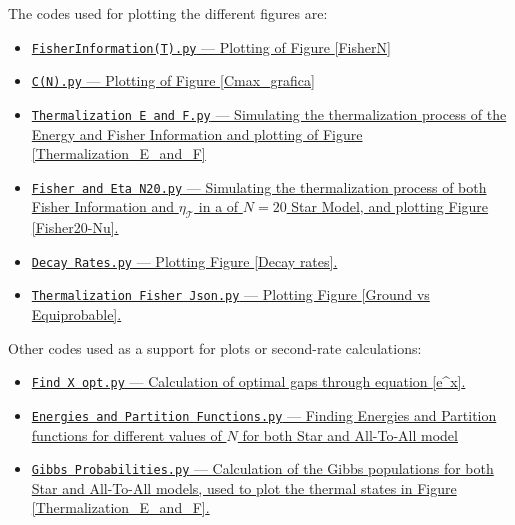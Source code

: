 \hspace{-0.5 cm}The codes used for plotting the different figures are:

\begin{itemize}
  \item \href{https://github.com/alberto7rodriguez/TFG-Alberto-Rodriguez/blob/9049af01d4c70d71c440c45a4eb79081c19504dd/FisherInformation(T).py}{\texttt{FisherInformation(T).py} — Plotting of Figure \ref{FisherN}}
  \item \href{https://github.com/alberto7rodriguez/TFG-Alberto-Rodriguez/blob/9049af01d4c70d71c440c45a4eb79081c19504dd/C(N).py}{\texttt{C(N).py} — Plotting of Figure \ref{Cmax_grafica}}
  \item \href{https://github.com/alberto7rodriguez/TFG-Alberto-Rodriguez/blob/9049af01d4c70d71c440c45a4eb79081c19504dd/Thermalization%20E%20%26%20F.py}{\texttt{Thermalization E and F.py} — Simulating the thermalization process of the Energy and Fisher Information and plotting of Figure \ref{Thermalization_E_and_F}}
  \item \href{https://github.com/alberto7rodriguez/TFG-Alberto-Rodriguez/blob/5fe2d094304230ce8fc1359bcfc20a419ec496e2/Fisher_and_Eta_N20.py}{\texttt{Fisher and Eta N20.py} — Simulating the thermalization process of both Fisher Information and $\eta_{\mathcal{T}}$ in a of $N=20$ Star Model, and plotting Figure \ref{Fisher20-Nu}.}
  \item \href{https://github.com/alberto7rodriguez/TFG-Alberto-Rodriguez/blob/346ab8400c583fc16bf81fb7f2f59714dbbb3573/Decay%20Rates.py}{\texttt{Decay Rates.py} — Plotting Figure \ref{Decay rates}.}
  \item \href{https://github.com/alberto7rodriguez/TFG-Alberto-Rodriguez/blob/346ab8400c583fc16bf81fb7f2f59714dbbb3573/Thermalization%20Fisher%20Json.py}{\texttt{Thermalization Fisher Json.py} — Plotting Figure \ref{Ground vs Equiprobable}.}
\end{itemize}
Other codes used as a support for plots or second-rate calculations:
\begin{itemize}
  \item \href{https://github.com/alberto7rodriguez/TFG-Alberto-Rodriguez/blob/9049af01d4c70d71c440c45a4eb79081c19504dd/Find X_opt.py}{\texttt{Find X opt.py} — Calculation of optimal gaps through equation \ref{e^x}.}
  \item \href{https://github.com/alberto7rodriguez/TFG-Alberto-Rodriguez/blob/aead520b00c099f157a43fada79d58cabea4dd1a/Energies%20and%20Partition%20Functions.py}{\texttt{Energies and Partition Functions.py} — Finding Energies and Partition functions for different values of $N$ for both Star and All-To-All model }
  \item \href{https://github.com/alberto7rodriguez/TFG-Alberto-Rodriguez/blob/5fe2d094304230ce8fc1359bcfc20a419ec496e2/Gibbs%20Probabilities.py}{\texttt{Gibbs Probabilities.py} — Calculation of the Gibbs populations for both Star and All-To-All models, used to plot the thermal states in Figure \ref{Thermalization_E_and_F}.}
\end{itemize}

